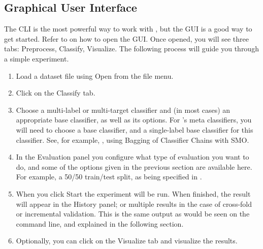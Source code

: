 \documentclass[11pt]{article}
\newcommand{\MEKA}{Meka}
\newcommand{\WEKA}{Weka}
\begin{document}
\subsection{Graphical User Interface}

The CLI is the most powerful way to work with \framework{\MEKA}, but the GUI is a good way to get started. Refer to  on how to open the GUI. Once opened, you will see three tabs: \textsf{Preprocess}, \textsf{Classify}, \textsf{Visualize}. The following process will guide you through a simple experiment.




\begin{enumerate}
	\item Load a dataset file using \textsf{Open} from the file menu. %
	\item Click on the \textsf{Classify} tab.
	\item \textsf{Choose} a multi-label or multi-target classifier and (in most cases) an appropriate \framework{\WEKA} base classifier, as well as its options. For \framework{\MEKA}'s meta classifiers, you will need to choose a \framework{\MEKA} base classifier, and a single-label \framework{\WEKA} base classifier for this classifier. See, for example, , using Bagging of Classifier Chains with SMO.
	\item In the \textsf{Evaluation} panel you configure what type of evaluation you want to do, and some of the options given in the previous section are available here. For example, a 50/50 train/test split, as being specified in .
	\item When you click \textsf{Start} the experiment will be run. When finished, the result will appear in the \textsf{History} panel; {\blue or multiple results in the case of cross-fold or incremental validation. This is the same output as would be seen on the command line, and explained in the following section.}
	\item Optionally, you can click on the \textsf{Visualize} tab and visualize the results.
\end{enumerate}
\end{document}
